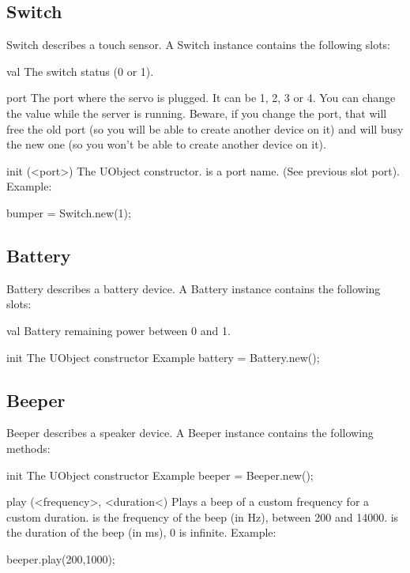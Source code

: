 \subsection{Switch}
Switch describes a touch sensor. A Switch instance contains the following
slots:

\begin{urbiscriptapi}
\item[val] The switch status (0 or 1).

\item[port] The port where the servo is plugged. It can be 1, 2, 3 or 4. You
  can change the value while the server is running. Beware, if you change
  the port, that will free the old port (so you will be able to create
  another device on it) and will busy the new one (so you won't be able to
  create another device on it).

\item[init](<port>) The UObject constructor.  is a port name. (See
  previous slot port). Example:
\begin{urbiunchecked}
  bumper = Switch.new(1);
\end{urbiunchecked}

\end{urbiscriptapi}

\subsection{Battery}
Battery describes a battery device. A Battery instance contains the following
slots:
\begin{urbiscriptapi}
\item[val] Battery remaining power between 0 and 1.
\item[init] The UObject constructor Example battery = Battery.new();
\end{urbiscriptapi}

\subsection{Beeper}
Beeper describes a speaker device. A Beeper instance contains the following
methods:

\begin{urbiscriptapi}
\item[init] The UObject constructor Example beeper = Beeper.new();
\item[play](<frequency>, <duration<) Plays a beep of a custom frequency for
  a custom duration.   is the frequency of the beep (in Hz),
  between 200 and 14000.   is the duration of the beep (in
  ms), 0 is infinite.  Example:
\begin{urbiunchecked}
beeper.play(200,1000);
\end{urbiunchecked}
\end{urbiscriptapi}

